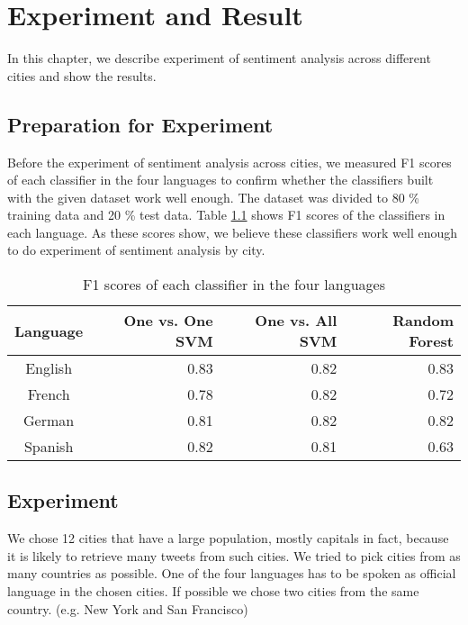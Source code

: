 \chapter{Experiment and Result}
In this chapter, we describe experiment of sentiment analysis across different cities and show the results.
\section{Preparation for Experiment}
Before the experiment of sentiment analysis across cities, we measured F1 scores of each classifier in the four languages to confirm whether the classifiers built with the given dataset work well enough.
The dataset was divided to 80 \% training data and 20 \% test data.
Table \ref{tab:f1score} shows F1 scores of the classifiers in each language.
As these scores show, we believe these classifiers work well enough to do experiment of sentiment analysis by city.


\begin{table}[ht]
	\caption{F1 scores of each classifier in the four languages}
	\begin{tabular}{|c|r|r|r|} \hline
	Language&One vs. One SVM &One vs. All SVM &Random Forest\\ \hline \hline
	English & 0.83 & 0.82 & 0.83  \\ \hline
	French & 0.78 & 0.82 & 0.72  \\ \hline
	German & 0.81 & 0.82 & 0.82 \\ \hline
	Spanish & 0.82 & 0.81 & 0.63  \\ \hline
	\end{tabular}
	\label{tab:f1score}
\end{table}

\section{Experiment}\label{sec:experiment}

We chose 12 cities that have a large population, mostly capitals in fact, because it is likely to retrieve many tweets from such cities.
We tried to pick cities from as many countries as possible.
One of the four languages has to be spoken as official language in the chosen cities.
If possible we chose two cities from the same country. (e.g. New York and San Francisco)

